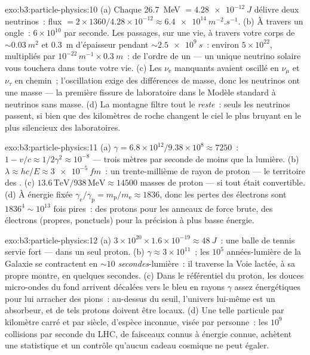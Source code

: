 \begin{solution}{exo:b3:particle-physics:10}
(a) Chaque \qty{26.7}{MeV} $= \qty{4.28e-12}{J}$ délivre deux
neutrinos~: flux $= 2\times1360/4.28\times10^{-12} \approx
\qty{6.4e14}{m^{-2}.s^{-1}}$. (b) À travers un ongle~:
$6\times10^{10}$ par seconde. Les passages, sur une vie, à travers
votre corps de ${\sim}\qty{0.03}{m^2}$ et \qty{0.3}{m} d'épaisseur
pendant ${\sim}\qty{2.5e9}{s}$~: environ $5\times10^{22}$, multipliés
par $10^{-22}\,\unit{m^{-1}}\times\qty{0.3}{m}$~: de l'ordre de un
--- un unique neutrino solaire vous touchera dans toute votre vie.
(c) Les $\nu_{\text{e}}$ manquants avaient oscillé en $\nu_\mu$ et
$\nu_\tau$ en chemin~; l'oscillation exige des différences de masse,
donc les neutrinos ont une masse --- la première fissure de
laboratoire dans le Modèle standard à neutrinos sans masse. (d) La
montagne filtre tout le \emph{reste}~: seuls les neutrinos passent,
si bien que des kilomètres de roche changent le ciel le plus bruyant
en le plus silencieux des laboratoires.
\end{solution}

\begin{solution}{exo:b3:particle-physics:11}
(a) $\gamma = 6.8\times10^{12}/9.38\times10^{8} \approx 7250$~:
$1 - v/c \approx 1/2\gamma^2 \approx 10^{-8}$ --- trois mètres par
seconde de moins que la lumière. (b) $\lambda \approx hc/E \approx
\qty{3e-5}{fm}$~: un trente-millième de rayon de proton --- le
territoire des . (c) $13.6\,\text{TeV}/938\,\text{MeV} \approx
14500$ masses de proton --- si tout était convertible. (d) À énergie
fixée $\gamma_{\text{e}}/\gamma_{\text{p}} =
m_{\text{p}}/m_{\text{e}} \approx 1836$, donc les pertes des
électrons sont $1836^4 \sim 10^{13}$ fois pires~: des protons pour
les anneaux de force brute, des électrons (propres, ponctuels) pour
la précision à plus basse énergie.
\end{solution}

\begin{solution}{exo:b3:particle-physics:12}
(a) $3\times10^{20}\times1.6\times10^{-19} \approx \qty{48}{J}$~:
une balle de tennis servie fort --- dans un seul proton. (b) $\gamma \approx
3\times10^{11}$~; les $10^{5}$ années-lumière de la Galaxie se
contractent en ${\sim}10$ \emph{secondes}-lumière~: il traverse la
Voie lactée, à sa propre montre, en quelques secondes. (c) Dans le
référentiel du proton, les douces micro-ondes du fond arrivent
décalées vers le bleu en rayons $\gamma$ assez énergétiques pour lui
arracher des pions~: au-dessus du seuil, l'univers lui-même est un
absorbeur, et de tels protons doivent être locaux. (d) Une telle
particule par kilomètre carré et par siècle, d'espèce inconnue,
visée par personne~: les $10^{9}$ collisions par seconde du LHC, de
faisceaux connus à énergie connue, achètent une statistique et un
contrôle qu'aucun cadeau cosmique ne peut égaler.
\end{solution}

